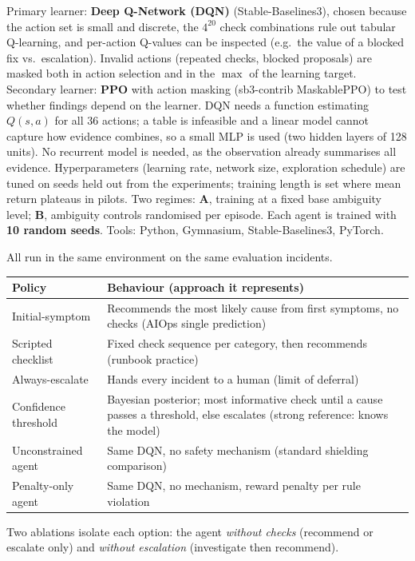\documentclass[10pt,a4paper]{article}
\newcommand{\sub}[1]{\par\vspace{1pt}{\bfseries #1}\par}
\begin{document}
\sub{5.4 Algorithm and training}
Primary learner: \textbf{Deep Q-Network (DQN)} (Stable-Baselines3), chosen because the action set is small and discrete, the $4^{20}$ check combinations rule out tabular Q-learning, and per-action Q-values can be inspected (e.g.\ the value of a blocked fix vs.\ escalation). Invalid actions (repeated checks, blocked proposals) are masked both in action selection and in the $\max$ of the learning target. Secondary learner: \textbf{PPO} with action masking (sb3-contrib MaskablePPO) to test whether findings depend on the learner. DQN needs a function estimating $Q(s,a)$ for all 36 actions; a table is infeasible and a linear model cannot capture how evidence combines, so a small MLP is used (two hidden layers of 128 units). No recurrent model is needed, as the observation already summarises all evidence. Hyperparameters (learning rate, network size, exploration schedule) are tuned on seeds held out from the experiments; training length is set where mean return plateaus in pilots. Two regimes: \textbf{A}, training at a fixed base ambiguity level; \textbf{B}, ambiguity controls randomised per episode. Each agent is trained with \textbf{10 random seeds}. Tools: Python, Gymnasium, Stable-Baselines3, PyTorch.

\sub{5.5 Benchmarks (baselines)}
All run in the same environment on the same evaluation incidents.\par\vspace{-3pt}
\begin{center}\small\renewcommand{\arraystretch}{0.95}
\begin{tabularx}{\textwidth}{@{}p{}L@{}}
\toprule
Policy & Behaviour (approach it represents) \\
\midrule
Initial-symptom & Recommends the most likely cause from first symptoms, no checks (AIOps single prediction) \\
Scripted checklist & Fixed check sequence per category, then recommends (runbook practice) \\
Always-escalate & Hands every incident to a human (limit of deferral) \\
Confidence threshold & Bayesian posterior; most informative check until a cause passes a threshold, else escalates (strong reference: knows the model) \\
Unconstrained agent & Same DQN, no safety mechanism (standard shielding comparison) \\
Penalty-only agent & Same DQN, no mechanism, reward penalty per rule violation \\
\bottomrule
\end{tabularx}
\end{center}
Two ablations isolate each option: the agent \emph{without checks} (recommend or escalate only) and \emph{without escalation} (investigate then recommend).
\end{document}
